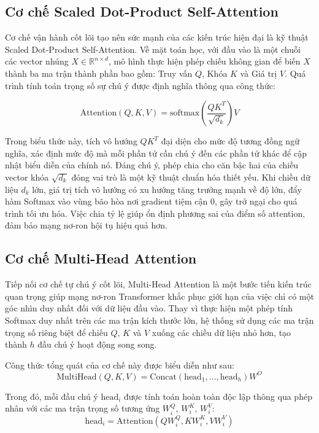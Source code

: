 \subsection{Cơ chế Scaled Dot-Product Self-Attention}
\label{subsec:scaled_attention}
Cơ chế vận hành cốt lõi tạo nên sức mạnh của các kiến trúc hiện đại là kỹ thuật Scaled Dot-Product Self-Attention. Về mặt toán học, với đầu vào là một chuỗi các vector nhúng $X \in \mathbb{R}^{n \times d}$, mô hình thực hiện phép chiếu không gian để biến $X$ thành ba ma trận thành phần bao gồm: Truy vấn $Q$, Khóa $K$ và Giá trị $V$. Quá trình tính toán trọng số sự chú ý được định nghĩa thông qua công thức:

\begin{equation}
    \text{Attention}(Q, K, V) = \text{softmax}\left(\frac{QK^T}{\sqrt{d_k}}\right)V
\end{equation}

Trong biểu thức này, tích vô hướng $QK^T$ đại diện cho mức độ tương đồng ngữ nghĩa, xác định mức độ mà mỗi phần tử cần chú ý đến các phần tử khác để cập nhật biểu diễn của chính nó. Đáng chú ý, phép chia cho căn bậc hai của chiều vector khóa $\sqrt{d_k}$ đóng vai trò là một kỹ thuật chuẩn hóa thiết yếu. Khi chiều dữ liệu $d_k$ lớn, giá trị tích vô hướng có xu hướng tăng trưởng mạnh về độ lớn, đẩy hàm Softmax vào vùng bão hòa nơi gradient tiệm cận 0, gây trở ngại cho quá trình tối ưu hóa. Việc chia tỷ lệ giúp ổn định phương sai của điểm số attention, đảm bảo mạng nơ-ron hội tụ hiệu quả hơn.

\subsection{Cơ chế Multi-Head Attention}
Tiếp nối cơ chế tự chú ý cốt lõi, Multi-Head Attention là một bước tiến kiến trúc quan trọng giúp mạng nơ-ron Transformer khắc phục giới hạn của việc chỉ có một góc nhìn duy nhất đối với dữ liệu đầu vào. Thay vì thực hiện một phép tính Softmax duy nhất trên các ma trận kích thước lớn, hệ thống sử dụng các ma trận trọng số riêng biệt để chiếu $Q$, $K$ và $V$ xuống các chiều dữ liệu nhỏ hơn, tạo thành $h$ đầu chú ý hoạt động song song. 

Công thức tổng quát của cơ chế này được biểu diễn như sau:
\begin{equation}
    \text{MultiHead}(Q, K, V) = \text{Concat}(\text{head}_1, \dots, \text{head}_h)W^O
\end{equation}

Trong đó, mỗi đầu chú ý $\text{head}_i$ được tính toán hoàn toàn độc lập thông qua phép nhân với các ma trận trọng số tương ứng $W_i^Q$, $W_i^K$, $W_i^V$:
\begin{equation}
    \text{head}_i = \text{Attention}(QW_i^Q, KW_i^K, VW_i^V)
\end{equation}


